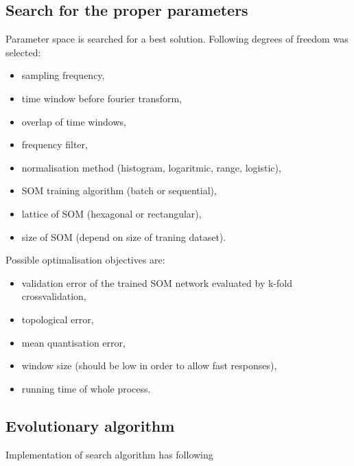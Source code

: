 \documentclass[a4paper,journal]{IEEEtran}
\begin{document}
\subsection{Search for the proper parameters}
Parameter space is searched for a best solution. Following degrees of 
freedom was selected:
\begin{itemize}
	\item sampling frequency,
	\item time window before fourier transform,
	\item overlap of time windows,
	\item frequency filter,
	\item normalisation method (histogram, logaritmic, range, logistic),
	\item SOM training algorithm (batch or sequential),
	\item lattice of SOM (hexagonal or rectangular),
	\item size of SOM (depend on size of traning dataset).
\end{itemize}
Possible optimalisation objectives are:
\begin{itemize}
	\item validation error of the trained SOM network evaluated by k-fold
	crossvalidation,
	\item topological error,
	\item mean quantisation error,
	\item window size (should be low in order to allow fast responses),
	\item running time of whole process.
\end{itemize}

\subsection{Evolutionary algorithm}
Implementation of search algorithm has following 


%
\end{document}
